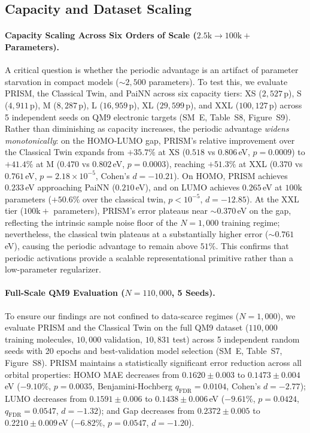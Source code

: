 \documentclass[10pt,twocolumn,letterpaper]{article}
\begin{document}
\subsection{Capacity and Dataset Scaling}
\label{sec:param_scaling}

\paragraph{Capacity Scaling Across Six Orders of Scale ($2.5\mathrm{k} \to 100\mathrm{k}+$ Parameters).}
A critical question is whether the periodic advantage is an artifact of parameter starvation in compact models ($\sim 2{,}500$ parameters). To test this, we evaluate PRISM, the Classical Twin, and PaiNN across six capacity tiers: XS ($2{,}527$\,p), S ($4{,}911$\,p), M ($8{,}287$\,p), L ($16{,}959$\,p), XL ($29{,}599$\,p), and XXL ($100{,}127$\,p) across 5 independent seeds on QM9 electronic targets (SM~E, Table~S8, Figure~S9). 
Rather than diminishing as capacity increases, the periodic advantage \textit{widens monotonically}: on the HOMO-LUMO gap, PRISM's relative improvement over the Classical Twin expands from $+35.7\%$ at XS ($0.518$ vs $0.806$\,eV, $p = 0.0009$) to $+41.4\%$ at M ($0.470$ vs $0.802$\,eV, $p = 0.0003$), reaching $\mathbf{+51.3\%}$ at XXL ($0.370$ vs $0.761$\,eV, $p = 2.18 \times 10^{-5}$, Cohen's $d = -10.21$). On HOMO, PRISM achieves $0.233$\,eV approaching PaiNN ($0.210$\,eV), and on LUMO achieves $0.265$\,eV at $100\mathrm{k}$ parameters ($+50.6\%$ over the classical twin, $p < 10^{-5}$, $d = -12.85$). At the XXL tier ($100\mathrm{k}+$ parameters), PRISM's error plateaus near $\sim 0.370$\,eV on the gap, reflecting the intrinsic sample noise floor of the $N = 1{,}000$ training regime; nevertheless, the classical twin plateaus at a substantially higher error ($\sim 0.761$\,eV), causing the periodic advantage to remain above $51\%$. This confirms that periodic activations provide a scalable representational primitive rather than a low-parameter regularizer.

\paragraph{Full-Scale QM9 Evaluation ($N = 110{,}000$, 5 Seeds).}
To ensure our findings are not confined to data-scarce regimes ($N = 1{,}000$), we evaluate PRISM and the Classical Twin on the full QM9 dataset ($110{,}000$ training molecules, $10{,}000$ validation, $10{,}831$ test) across 5 independent random seeds with 20 epochs and best-validation model selection (SM~E, Table~S7, Figure~S8). PRISM maintains a statistically significant error reduction across all orbital properties: HOMO MAE decreases from $0.1620 \pm 0.003$ to $\mathbf{0.1473 \pm 0.004}$\,eV ($-9.10\%$, $p = 0.0035$, Benjamini-Hochberg $q_{\mathrm{FDR}} = 0.0104$, Cohen's $d = -2.77$); LUMO decreases from $0.1591 \pm 0.006$ to $\mathbf{0.1438 \pm 0.006}$\,eV ($-9.61\%$, $p = 0.0424$, $q_{\mathrm{FDR}} = 0.0547$, $d = -1.32$); and Gap decreases from $0.2372 \pm 0.005$ to $\mathbf{0.2210 \pm 0.009}$\,eV ($-6.82\%$, $p = 0.0547$, $d = -1.20$).
\end{document}
